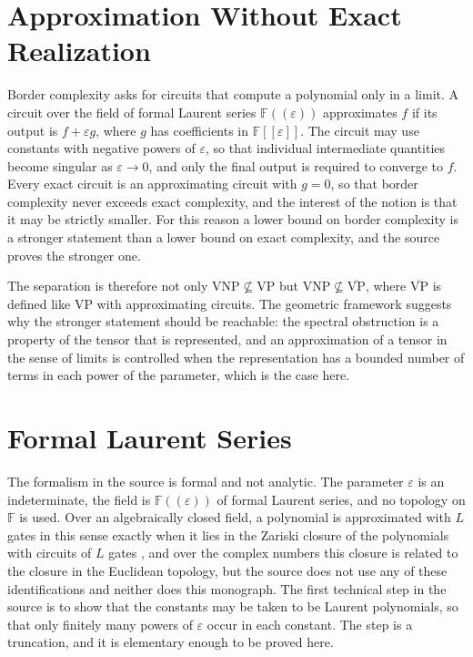\documentclass[11pt,letterpaper]{report}
\theoremstyle{plain}
\theoremstyle{definition}
\theoremstyle{remark}
\newcommand{\VP}{\mathrm{VP}}
\newcommand{\VNP}{\mathrm{VNP}}
\begin{document}
\section{Approximation Without Exact Realization}

Border complexity asks for circuits that compute a polynomial only in a limit. A circuit over the field of formal Laurent series $\mathbb F((\varepsilon))$ approximates $f$ if its output is $f+\varepsilon g$, where $g$ has coefficients in $\mathbb F[[\varepsilon]]$. The circuit may use constants with negative powers of $\varepsilon$, so that individual intermediate quantities become singular as $\varepsilon\to0$, and only the final output is required to converge to $f$. Every exact circuit is an approximating circuit with $g=0$, so that border complexity never exceeds exact complexity, and the interest of the notion is that it may be strictly smaller. For this reason a lower bound on border complexity is a stronger statement than a lower bound on exact complexity, and the source proves the stronger one.

The separation is therefore not only $\VNP\not\subseteq\VP$ but $\VNP\not\subseteq\overline{\VP}$, where $\overline{\VP}$ is defined like $\VP$ with approximating circuits. The geometric framework suggests why the stronger statement should be reachable: the spectral obstruction is a property of the tensor that is represented, and an approximation of a tensor in the sense of limits is controlled when the representation has a bounded number of terms in each power of the parameter, which is the case here.

\section{Formal Laurent Series}

The formalism in the source is formal and not analytic. The parameter $\varepsilon$ is an indeterminate, the field is $\mathbb F((\varepsilon))$ of formal Laurent series, and no topology on $\mathbb F$ is used. Over an algebraically closed field, a polynomial is approximated with $L$ gates in this sense exactly when it lies in the Zariski closure of the polynomials with circuits of $L$ gates \cite{Alder1984,Burgisser2004}, and over the complex numbers this closure is related to the closure in the Euclidean topology, but the source does not use any of these identifications and neither does this monograph. The first technical step in the source is to show that the constants may be taken to be Laurent polynomials, so that only finitely many powers of $\varepsilon$ occur in each constant. The step is a truncation, and it is elementary enough to be proved here.
\end{document}
